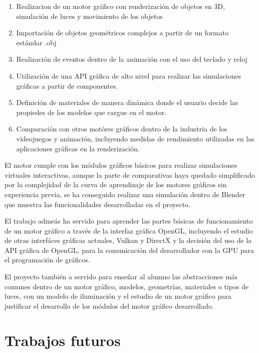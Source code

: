 \documentclass[a4paper, 17pt]{book}
\begin{document}
\begin{enumerate}
  \item Realizacion de un motor gráfico con renderización de objetos en 3D, simulación de luces y movimiento de los objetos
  \item Importación de objetos geométricos complejos a partir de un formato estándar .obj
  \item Realización de eventos dentro de la animación con el uso del teclado y reloj
  \item Utilización de una API gráfica de alto nivel para realizar las simulaciones gráficas a partir de componentes.
  \item Definición de materiales de manera dinámica donde el usuario decide las propiedes de los modelos que cargue en el motor.
  \item Comparación con otros motóres gráficos dentro de la industria de los videojuegos y animación, incluyendo medidas de 
  rendimiento utilizadas en las aplicaciones gráficas en la renderización.
\end{enumerate}

El motor cumple con los módulos gráficos básicos para realizar simulaciones virtuales interactivas, aunque la parte de comparativas haya
quedado simplificado por la complejidad de la curva de aprendizaje de los motores gráficos sin experiencia previa, se ha conseguido realizar
una simulación dentro de Blender que muestra las funcionalidades desarrolladas en el proyecto. 

\vspace{1mm} %

El trabajo admeás ha servido para aprender las partes básicas de funcionamiento de un motor gráfico a través de la interfaz gráfica OpenGL, 
incluyendo el estudio de otras interfáces gráficas actuales, Vulkan y DirectX y la decisión del uso de la API gráfica de OpenGL, para
la comunicación del desarrollador con la GPU para el programación de gráficos.

\vspace{1mm} %

El proyecto también a servido para enseñar al alumno las abstracciones más comunes dentro de un motor gráfico, modelos, geometrías, materiales
o tipos de luces, con un modelo de iluminación y el estudio de un motor gráfico para justificar el desarrollo de los módulos del motor 
gráfico desarrollado.

\section{Trabajos futuros}
\label{sec:trabajos_futuros}
\end{document}
